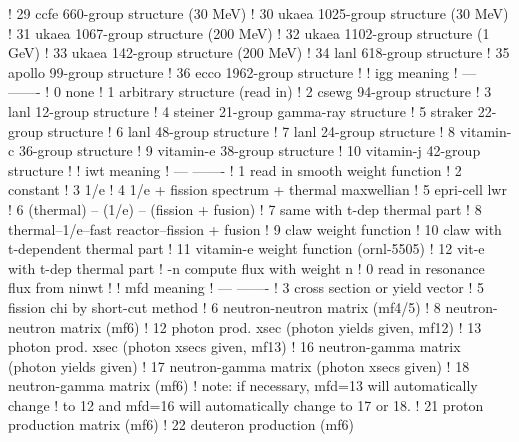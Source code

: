 \begin{ccode}
   !     29           ccfe   660-group structure  (30 MeV)
   !     30           ukaea 1025-group structure  (30 MeV)
   !     31           ukaea 1067-group structure (200 MeV)
   !     32           ukaea 1102-group structure   (1 GeV)
   !     33           ukaea  142-group structure (200 MeV)
   !     34           lanl 618-group structure
   !     35           apollo 99-group structure
   !     36           ecco 1962-group structure
   !
   !     igg          meaning
   !     ---          -------
   !      0           none
   !      1           arbitrary structure (read in)
   !      2           csewg 94-group structure
   !      3           lanl 12-group structure
   !      4           steiner 21-group gamma-ray structure
   !      5           straker 22-group structure
   !      6           lanl 48-group structure
   !      7           lanl 24-group structure
   !      8           vitamin-c 36-group structure
   !      9           vitamin-e 38-group structure
   !     10           vitamin-j 42-group structure
   !
   !     iwt          meaning
   !     ---          -------
   !      1           read in smooth weight function
   !      2           constant
   !      3           1/e
   !      4           1/e + fission spectrum + thermal maxwellian
   !      5           epri-cell lwr
   !      6           (thermal) -- (1/e) -- (fission + fusion)
   !      7           same with t-dep thermal part
   !      8           thermal--1/e--fast reactor--fission + fusion
   !      9           claw weight function
   !     10           claw with t-dependent thermal part
   !     11           vitamin-e weight function (ornl-5505)
   !     12           vit-e with t-dep thermal part
   !     -n           compute flux with weight n
   !      0           read in resonance flux from ninwt
   !
   !     mfd          meaning
   !     ---          -------
   !      3           cross section or yield vector
   !      5           fission chi by short-cut method
   !      6           neutron-neutron matrix (mf4/5)
   !      8           neutron-neutron matrix (mf6)
   !     12           photon prod. xsec (photon yields given, mf12)
   !     13           photon prod. xsec (photon xsecs given, mf13)
   !     16           neutron-gamma matrix (photon yields given)
   !     17           neutron-gamma matrix (photon xsecs given)
   !     18           neutron-gamma matrix (mf6)
   !         note: if necessary, mfd=13 will automatically change
   !         to 12 and mfd=16 will automatically change to 17 or 18.
   !     21           proton production matrix (mf6)
   !     22           deuteron production (mf6)

\end{ccode}
